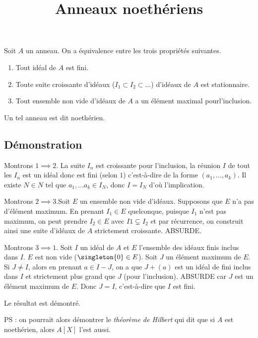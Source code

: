\documentclass[fontsize=12pt,twoside=false,parskip=half, french]{scrartcl}
\title{Anneaux noethériens}
\date{}
\author{}
\begin{document}
\maketitle
   \begin{Theoreme}
      Soit $A$ un anneau. On a équivalence entre les trois propriétés suivantes.
      \begin{enumerate}
         \item Tout idéal de $A$ est fini.
         \item Toute suite croissante d’idéaux ($I_1 \subset I_2 \subset \ldots$) d’idéaux de $A$
               est stationnaire.
         \item Tout ensemble non vide d’idéaux de $A$ a un élément maximal pourl’inclusion.
      \end{enumerate}
      Un tel anneau est dit noethérien.
   \end{Theoreme}
   \subsection{Démonstration}
      Montrons $1 \implies 2$. La suite $I_n$ est croissante pour l’inclusion, la réunion $I$ de
      tout les $I_n$ est un idéal donc est fini (selon $1$) c’est-à-dire de la forme $(a_1, \ldots
      , a_k)$. Il existe $N \in N$ tel que $a_1, \ldots a_k \in I_N$, donc $I = I_N$ d’où l’implication.

      Montrons $2 \implies 3$.Soit $E$ un ensemble non vide d’idéaux. Supposons que $E$ n’a pas
      d’élément maximum. En prenant $I_1 \in E$ quelconque, puisque $I_1$ n’est pas maximum, on 
      peut prendre $I_2 \in E$ avec $I1 \subsetneq I_2$ et par récurrence, on construit ainsi une
      suite d’idéaux de $A$ strictement croissante. ABSURDE. 
      
      Montrons $3 \implies 1$. Soit $I$ un idéal de $A$ et $E$ l’ensemble des idéaux finis inclus dans $I$. $E$ est non vide ($\singleton{0} \in E$). Soit $J$ un élément maximum de $E$. 
      Si $J \neq I$, alors en prenant $a \in I - J$, on a que $J + (a)$ est un idéal de fini inclus
      dans $I$ et strictement plus grand que $J$ (pour l’inclusion). ABSURDE car $J$ est un élément maximum de $E$. Donc $J = I$, c’est-à-dire que $I$ est fini.

      Le résultat est démontré. 
      
      PS : on pourrait alors démontrer le \emph{théorème de Hilbert} qui dit que si $A$ est noethérien,
      alors $A[X]$ l’est aussi.
\end{document}
